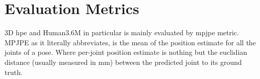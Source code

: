 \section{Evaluation Metrics} %
3D \ac{hpe} and Human3.6M in particular is mainly evaluated by \ac{mpjpe} metric. MPJPE as it literally abbreviates, is the mean of the position estimate for all the joints of a pose. Where per-joint position estimate is nothing but the euclidian distance (usually measured in mm) between the predicted joint to its ground truth.
